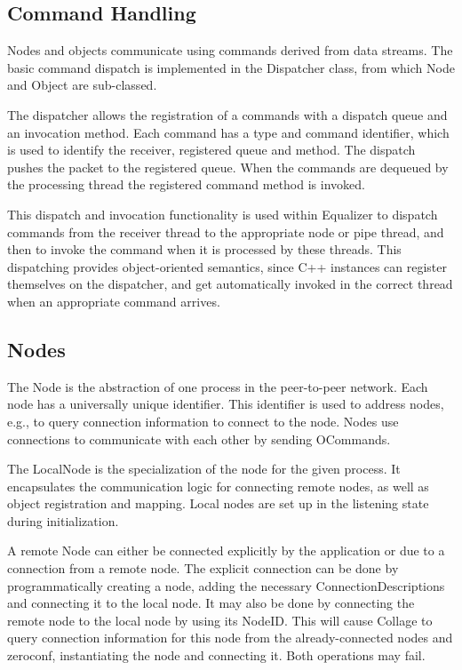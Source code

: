 \subsection{Command Handling}

Nodes and objects communicate using commands derived from data streams. The
basic command dispatch is implemented in the \textsf{Dispatcher} class, from
which \textsf{Node} and \textsf{Object} are sub-classed.

The dispatcher allows the registration of a commands with a dispatch queue and
an invocation method. Each command has a type and command identifier, which is
used to identify the receiver, registered queue and method. The dispatch pushes
the packet to the registered queue. When the commands are dequeued by the
processing thread the registered command method is invoked.

This dispatch and invocation functionality is used within Equalizer to dispatch
commands from the receiver thread to the appropriate node or pipe thread, and
then to invoke the command when it is processed by these threads. This
dispatching provides object-oriented semantics, since C++ instances can register
themselves on the dispatcher, and get automatically invoked in the correct
thread when an appropriate command arrives.

\subsection{Nodes}

The \textsf{Node} is the abstraction of one process in the peer-to-peer network.
Each node has a universally unique identifier. This identifier is used to
address nodes, e.g., to query connection information to connect to the node.
Nodes use connections to communicate with each other by sending
\textsf{OCommand}s.

The \textsf{LocalNode} is the specialization of the node for the given process.
It encapsulates the communication logic for connecting remote nodes, as well as
object registration and mapping. Local nodes are set up in the listening state
during initialization.

A remote \textsf{Node} can either be connected explicitly by the application or
due to a connection from a remote node. The explicit connection can be done by
programmatically creating a node, adding the necessary
\textsf{ConnectionDescription}s and connecting it to the local node. It may also
be done by connecting the remote node to the local node by using its
\textsf{NodeID}. This will cause Collage to query connection information for
this node from the already-connected nodes and zeroconf, instantiating the node
and connecting it. Both operations may fail.

